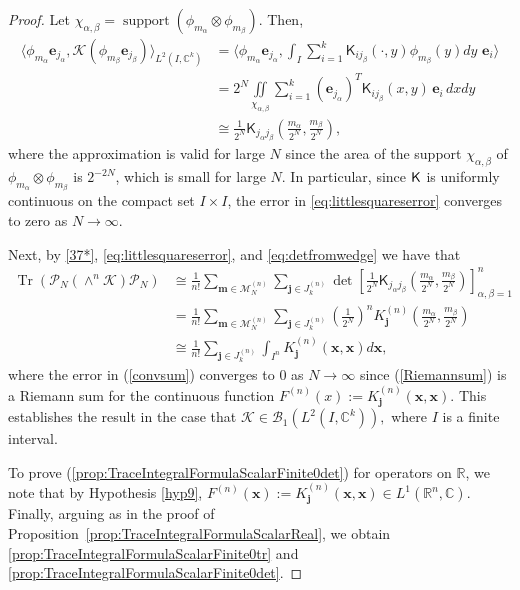 \documentclass{birkjour}
\theoremstyle{definition}
\theoremstyle{remark}
\numberwithin{equation}{section}
\newcommand{\cB}{{\mathcal B}}
\begin{document}
\begin{proof}
Let $\chi_{\alpha, \beta} = \operatorname{support}(\phi_{m_\alpha} \otimes
\phi_{m_\beta})$.  Then,
\begin{align} \nonumber 
  \langle \phi_{m_{\alpha}} \mathbf{e}_{j_{\alpha}}, \mathcal{K}\left( \phi_{m_{\beta}} \mathbf{e}_{j_{\beta}}\right) \rangle_{L^2(I,  \mathbb{C}^k)} 
    &= \langle \phi_{m_{\alpha}} \mathbf{e}_{j_{\alpha}}, \int_I \sum_{i=1}^k \textsf{K}_{ij_{\beta}}(\cdot,y) \phi_{m_{\beta}}(y) dy \,\,\mathbf{e}_{i} \rangle\\ \nonumber
    &= 2^N  \iint\limits_{\chi_{\alpha,\beta}} \sum_{i=1}^k (\mathbf{e}_{j_{\alpha}})^T \textsf{K}_{i j_{\beta}}(x,y)  \,\mathbf{e}_i\, dx dy\\  
%
    &    \cong \frac{1}{2^N} \textsf{K}_{j_{\alpha} j_{\beta}} \left(\frac{m_{\alpha}}{2^N}, \frac{m_{\beta}}{2^N}\right),
    \label{eq:littlesquareserror}
\end{align}
where the approximation is valid for large $N$ 
since the area of the support $\chi_{\alpha, \beta}$ of  $\phi_{m_\alpha} \otimes
\phi_{m_\beta}$ is 
 $2^{-2N}$, which is small for large $N$.
In particular, since $\textsf K$ is uniformly 
continuous on the compact set $I\times I$, the 
error in \eqref{eq:littlesquareserror} converges to zero as $N \to \infty$.

Next, by \eqref{37*}, \eqref{eq:littlesquareserror}, and \eqref{eq:detfromwedge}
we have that 
\begin{align}
\operatorname{Tr}\left( \mathcal{P}_N \left({\wedge}^n \mathcal{K} \right)\mathcal{P}_N \right) &\cong \frac{1}{n!} \sum_{\mathbf{m} \in \mathcal{M}_N^{(n)}} \sum_{\mathbf{j} \in J_k^{(n)}} \det\left[ \frac{1}{2^N} \textsf{K}_{j_{\alpha}j_{\beta}} \left( \frac{m_{\alpha}}{2^N}, \frac{m_{\beta}}{2^N}\right)\right]_{\alpha, \beta = 1}^n
\nonumber
\\
&=
\label{Riemannsum} \frac{1}{n!} \sum_{\mathbf{m} \in \mathcal{M}_N^{(n)}} \sum_{\mathbf{j} \in J_k^{(n)}} \left(\frac{1}{2^N}\right)^n K_{\mathbf{j}}^{(n)}\left( \frac{m_{\alpha}}{2^N}, \frac{m_{\beta}}{2^N}\right)
\\ \label{convsum}
&\cong \frac{1}{n!} \sum_{\mathbf{j}\in J_k^{(n)}} \int_{I^n} K_{\mathbf j}^{(n)}(\mathbf{x}, \mathbf{x}) d\mathbf{x},
\end{align}
where the error in (\ref{convsum}) converges to $0$ as $N\to\infty$ since (\ref{Riemannsum}) is a Riemann sum for the continuous function $F^{(n)}(x) := {K}_{\mathbf j}^{(n)}(\mathbf{x}, \mathbf{x}).$ This establishes the result in the case that $\mathcal{K} \in \cB_1(L^2(I,\mathbb{C}^k)),$ where $I$ is a finite interval. 

To prove (\ref{prop:TraceIntegralFormulaScalarFinite0det}) for operators on $\mathbb{R}$, we note that by  Hypothesis \ref{hyp9}, $F^{(n)}(\mathbf{x}) := K_{\mathbf j}^{(n)}(\mathbf{x}, \mathbf{x}) \in L^1(\mathbb{R}^n, \mathbb{C})$. 
Finally, arguing as in the proof of 
Proposition~\ref{prop:TraceIntegralFormulaScalarReal}, we obtain \eqref{prop:TraceIntegralFormulaScalarFinite0tr} and \eqref{prop:TraceIntegralFormulaScalarFinite0det}. 
\end{proof}
\end{document}
